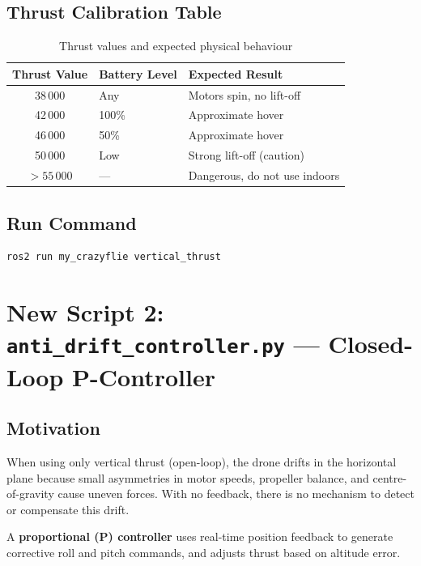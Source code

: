 \documentclass[11pt,a4paper]{article}
\begin{document}
\subsection{Thrust Calibration Table}

\begin{table}[h!]
\centering
\caption{Thrust values and expected physical behaviour}
\vspace{0.3em}
\begin{tabular}{@{}cll@{}}
\toprule
\textbf{Thrust Value} & \textbf{Battery Level} & \textbf{Expected Result} \\ \midrule
38\,000 & Any   & Motors spin, no lift-off \\
42\,000 & 100\% & Approximate hover \\
46\,000 & 50\%  & Approximate hover \\
50\,000 & Low   & Strong lift-off (caution) \\
$>55\,000$ & --- & Dangerous, do not use indoors \\ \bottomrule
\end{tabular}
\end{table}

\subsection{Run Command}
\begin{lstlisting}[language=bash]
ros2 run my_crazyflie vertical_thrust
\end{lstlisting}

\section{New Script 2: \texttt{anti\_drift\_controller.py} — Closed-Loop P-Controller}

\subsection{Motivation}

When using only vertical thrust (open-loop), the drone drifts in the horizontal plane because small asymmetries in motor speeds, propeller balance, and centre-of-gravity cause uneven forces. With no feedback, there is no mechanism to detect or compensate this drift.

A \textbf{proportional (P) controller} uses real-time position feedback to generate corrective roll and pitch commands, and adjusts thrust based on altitude error.
\end{document}
